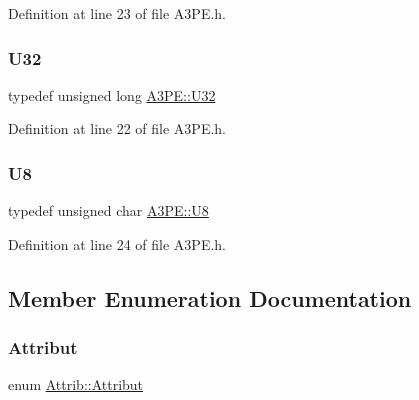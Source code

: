 Definition at line 23 of file A3\+P\+E.\+h.

\mbox{\label{classA3PE_af2773f4a4f8e9940b1e008386c4e908c}} 
\subsubsection{\texorpdfstring{U32}{U32}}
{\footnotesize\ttfamily typedef unsigned long \hyperlink{classA3PE_af2773f4a4f8e9940b1e008386c4e908c}{A3\+P\+E\+::\+U32}}



Definition at line 22 of file A3\+P\+E.\+h.

\mbox{\label{classA3PE_ab70116c2810a9a01142a33c69fdda039}} 
\subsubsection{\texorpdfstring{U8}{U8}}
{\footnotesize\ttfamily typedef unsigned char \hyperlink{classA3PE_ab70116c2810a9a01142a33c69fdda039}{A3\+P\+E\+::\+U8}}



Definition at line 24 of file A3\+P\+E.\+h.



\subsection{Member Enumeration Documentation}
\mbox{\label{classAttrib_a69e171d7cc6417835a5a306d3c764235}} 
\subsubsection{\texorpdfstring{Attribut}{Attribut}}
{\footnotesize\ttfamily enum \hyperlink{classAttrib_a69e171d7cc6417835a5a306d3c764235}{Attrib\+::\+Attribut}\hspace{0.3cm}{\ttfamily [inherited]}}

